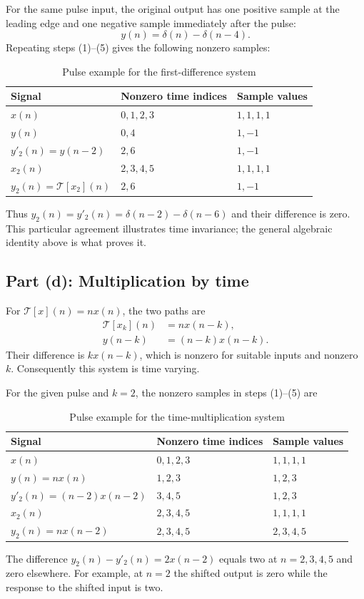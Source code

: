 For the same pulse input, the original output has one positive sample
at the leading edge and one negative sample immediately after the pulse:
\begin{equation}
  y(n)=\delta(n)-\delta(n-4).
\end{equation}
Repeating steps (1)--(5) gives the following nonzero samples:
\begin{table}[H]
  \centering
  \caption{Pulse example for the first-difference system}
  \label{tab:p26c}
  \begin{tabular}{lll}
    \toprule
    Signal & Nonzero time indices & Sample values\\
    \midrule
    $x(n)$ & $0,1,2,3$ & $1,1,1,1$\\
    $y(n)$ & $0,4$ & $1,-1$\\
    $y'_2(n)=y(n-2)$ & $2,6$ & $1,-1$\\
    $x_2(n)$ & $2,3,4,5$ & $1,1,1,1$\\
    $y_2(n)=\mathcal{T}[x_2](n)$ & $2,6$ & $1,-1$\\
    \bottomrule
  \end{tabular}
\end{table}
Thus $y_2(n)=y'_2(n)=\delta(n-2)-\delta(n-6)$ and their difference
is zero. This particular agreement illustrates time invariance; the
general algebraic identity above is what proves it.

\subsection{Part (d): Multiplication by time}
For $\mathcal{T}[x](n)=n x(n)$, the two paths are
\begin{align}
  \mathcal{T}[x_k](n)&=n x(n-k),\\
  y(n-k)&=(n-k)x(n-k).
\end{align}
Their difference is $k x(n-k)$, which is nonzero for suitable inputs
and nonzero $k$. Consequently this system is time varying.

For the given pulse and $k=2$, the nonzero samples in steps (1)--(5) are
\begin{table}[H]
  \centering
  \caption{Pulse example for the time-multiplication system}
  \label{tab:p26d}
  \begin{tabular}{lll}
    \toprule
    Signal & Nonzero time indices & Sample values\\
    \midrule
    $x(n)$ & $0,1,2,3$ & $1,1,1,1$\\
    $y(n)=nx(n)$ & $1,2,3$ & $1,2,3$\\
    $y'_2(n)=(n-2)x(n-2)$ & $3,4,5$ & $1,2,3$\\
    $x_2(n)$ & $2,3,4,5$ & $1,1,1,1$\\
    $y_2(n)=nx(n-2)$ & $2,3,4,5$ & $2,3,4,5$\\
    \bottomrule
  \end{tabular}
\end{table}
The difference $y_2(n)-y'_2(n)=2x(n-2)$ equals two at
$n=2,3,4,5$ and zero elsewhere. For example, at $n=2$ the shifted
output is zero while the response to the shifted input is two.

